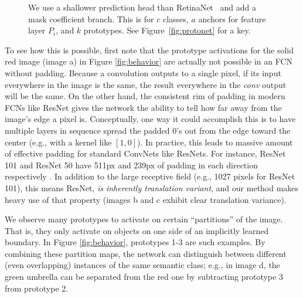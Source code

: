 \documentclass[10pt,journal,compsoc]{IEEEtran}
\begin{document}
    \begin{figure}
    \centering
    
\caption{ We use a shallower prediction head than RetinaNet~\cite{retinanet} and add a mask coefficient branch. This is for $c$ classes, $a$ anchors for feature layer $P_i$, and $k$ prototypes. See Figure~\ref{fig:protonet} for a key.}
\label{fig:pred_head}
\end{figure}     
To see how this is possible, first note that the prototype activations for the solid red image (image a) in Figure \ref{fig:behavior} are actually not possible in an FCN without padding. Because a convolution outputs to a single pixel, if its input everywhere in the image is the same, the result everywhere in the \textit{conv} output will be the same. On the other hand, the consistent rim of padding in modern FCNs like ResNet gives the network the ability to tell how far away from the image's edge a pixel is. Conceptually, one way it could accomplish this is to have multiple layers in sequence spread the padded 0's out from the edge toward the center (e.g., with a kernel like $[1, 0]$). In practice, this leads to massive amount of effective padding for standard ConvNets like ResNets. For instance, ResNet 101 and ResNet 50 have 511px and 239px of padding in each direction respectively \cite{araujo2019computing}. In addition to the large receptive field (e.g., 1027 pixels for ResNet 101), this means ResNet, \textit{is inherently translation variant}, and our method makes heavy use of that property (images b and c exhibit clear translation variance).

We observe many prototypes to activate on certain ``partitions'' of the image. That is, they only activate on objects on one side of an implicitly learned boundary. In Figure \ref{fig:behavior}, prototypes 1-3 are such examples. By combining these partition maps, the network can distinguish between different (even overlapping) instances of the same semantic class; e.g., in image d, the green umbrella can be separated from the red one by subtracting prototype 3 from prototype 2.
\end{document}
